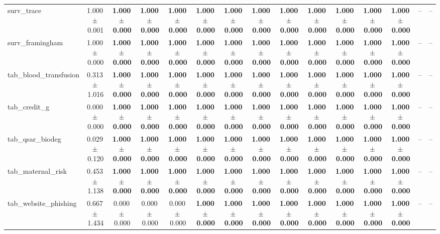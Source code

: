 \documentclass[8pt]{extarticle}
\begin{document}
\begin{longtable}{l*{14}{c}}
surv\_trace & 1.000\,$\pm$\,0.001 & \textbf{1.000\,$\pm$\,0.000} & \textbf{1.000\,$\pm$\,0.000} & \textbf{1.000\,$\pm$\,0.000} & \textbf{1.000\,$\pm$\,0.000} & \textbf{1.000\,$\pm$\,0.000} & \textbf{1.000\,$\pm$\,0.000} & \textbf{1.000\,$\pm$\,0.000} & \textbf{1.000\,$\pm$\,0.000} & \textbf{1.000\,$\pm$\,0.000} & \textbf{1.000\,$\pm$\,0.000} & \textbf{1.000\,$\pm$\,0.000} & -- & -- \\
surv\_framingham & 1.000\,$\pm$\,0.000 & \textbf{1.000\,$\pm$\,0.000} & \textbf{1.000\,$\pm$\,0.000} & \textbf{1.000\,$\pm$\,0.000} & \textbf{1.000\,$\pm$\,0.000} & \textbf{1.000\,$\pm$\,0.000} & \textbf{1.000\,$\pm$\,0.000} & \textbf{1.000\,$\pm$\,0.000} & \textbf{1.000\,$\pm$\,0.000} & \textbf{1.000\,$\pm$\,0.000} & \textbf{1.000\,$\pm$\,0.000} & \textbf{1.000\,$\pm$\,0.000} & -- & -- \\
tab\_blood\_transfusion & 0.313\,$\pm$\,1.016 & \textbf{1.000\,$\pm$\,0.000} & \textbf{1.000\,$\pm$\,0.000} & \textbf{1.000\,$\pm$\,0.000} & \textbf{1.000\,$\pm$\,0.000} & \textbf{1.000\,$\pm$\,0.000} & \textbf{1.000\,$\pm$\,0.000} & \textbf{1.000\,$\pm$\,0.000} & \textbf{1.000\,$\pm$\,0.000} & \textbf{1.000\,$\pm$\,0.000} & \textbf{1.000\,$\pm$\,0.000} & \textbf{1.000\,$\pm$\,0.000} & -- & -- \\
tab\_credit\_g & 0.000\,$\pm$\,0.000 & \textbf{1.000\,$\pm$\,0.000} & \textbf{1.000\,$\pm$\,0.000} & \textbf{1.000\,$\pm$\,0.000} & \textbf{1.000\,$\pm$\,0.000} & \textbf{1.000\,$\pm$\,0.000} & \textbf{1.000\,$\pm$\,0.000} & \textbf{1.000\,$\pm$\,0.000} & \textbf{1.000\,$\pm$\,0.000} & \textbf{1.000\,$\pm$\,0.000} & \textbf{1.000\,$\pm$\,0.000} & \textbf{1.000\,$\pm$\,0.000} & -- & -- \\
tab\_qsar\_biodeg & 0.029\,$\pm$\,0.120 & \textbf{1.000\,$\pm$\,0.000} & \textbf{1.000\,$\pm$\,0.000} & \textbf{1.000\,$\pm$\,0.000} & \textbf{1.000\,$\pm$\,0.000} & \textbf{1.000\,$\pm$\,0.000} & \textbf{1.000\,$\pm$\,0.000} & \textbf{1.000\,$\pm$\,0.000} & \textbf{1.000\,$\pm$\,0.000} & \textbf{1.000\,$\pm$\,0.000} & \textbf{1.000\,$\pm$\,0.000} & \textbf{1.000\,$\pm$\,0.000} & -- & -- \\
tab\_maternal\_risk & 0.453\,$\pm$\,1.138 & \textbf{1.000\,$\pm$\,0.000} & \textbf{1.000\,$\pm$\,0.000} & \textbf{1.000\,$\pm$\,0.000} & \textbf{1.000\,$\pm$\,0.000} & \textbf{1.000\,$\pm$\,0.000} & \textbf{1.000\,$\pm$\,0.000} & \textbf{1.000\,$\pm$\,0.000} & \textbf{1.000\,$\pm$\,0.000} & \textbf{1.000\,$\pm$\,0.000} & \textbf{1.000\,$\pm$\,0.000} & \textbf{1.000\,$\pm$\,0.000} & -- & -- \\
tab\_website\_phishing & 0.667\,$\pm$\,1.434 & 0.000\,$\pm$\,0.000 & 0.000\,$\pm$\,0.000 & 0.000\,$\pm$\,0.000 & \textbf{1.000\,$\pm$\,0.000} & \textbf{1.000\,$\pm$\,0.000} & \textbf{1.000\,$\pm$\,0.000} & \textbf{1.000\,$\pm$\,0.000} & \textbf{1.000\,$\pm$\,0.000} & \textbf{1.000\,$\pm$\,0.000} & \textbf{1.000\,$\pm$\,0.000} & \textbf{1.000\,$\pm$\,0.000} & -- & -- \\
\end{longtable}
\end{document}
